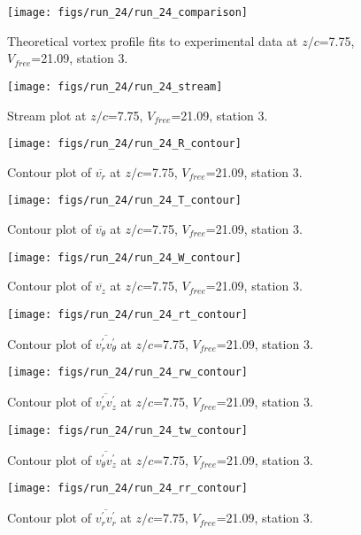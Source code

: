 \begin{figure}[H]
\centering
\texttt{[image: figs/run\_24/run\_24\_comparison]}
\caption{Theoretical vortex profile fits to experimental data at $z/c$=7.75, $V_{free}$=21.09, station 3.}
\end{figure}


\begin{figure}[H]
\centering
\texttt{[image: figs/run\_24/run\_24\_stream]}
\caption{Stream plot at $z/c$=7.75, $V_{free}$=21.09, station 3.}
\end{figure}


\begin{figure}[H]
\centering
\texttt{[image: figs/run\_24/run\_24\_R\_contour]}
\caption{Contour plot of $\overline{v_{r}}$ at $z/c$=7.75, $V_{free}$=21.09, station 3.}
\end{figure}


\begin{figure}[H]
\centering
\texttt{[image: figs/run\_24/run\_24\_T\_contour]}
\caption{Contour plot of $\overline{v_{\theta}}$ at $z/c$=7.75, $V_{free}$=21.09, station 3.}
\end{figure}


\begin{figure}[H]
\centering
\texttt{[image: figs/run\_24/run\_24\_W\_contour]}
\caption{Contour plot of $\overline{v_{z}}$ at $z/c$=7.75, $V_{free}$=21.09, station 3.}
\end{figure}


\begin{figure}[H]
\centering
\texttt{[image: figs/run\_24/run\_24\_rt\_contour]}
\caption{Contour plot of $\overline{v_{r}^{\prime} v_{\theta}^{\prime}}$ at $z/c$=7.75, $V_{free}$=21.09, station 3.}
\end{figure}


\begin{figure}[H]
\centering
\texttt{[image: figs/run\_24/run\_24\_rw\_contour]}
\caption{Contour plot of $\overline{v_{r}^{\prime} v_{z}^{\prime}}$ at $z/c$=7.75, $V_{free}$=21.09, station 3.}
\end{figure}


\begin{figure}[H]
\centering
\texttt{[image: figs/run\_24/run\_24\_tw\_contour]}
\caption{Contour plot of $\overline{v_{\theta}^{\prime} v_{z}^{\prime}}$ at $z/c$=7.75, $V_{free}$=21.09, station 3.}
\end{figure}


\begin{figure}[H]
\centering
\texttt{[image: figs/run\_24/run\_24\_rr\_contour]}
\caption{Contour plot of $\overline{v_{r}^{\prime} v_{r}^{\prime}}$ at $z/c$=7.75, $V_{free}$=21.09, station 3.}
\end{figure}


